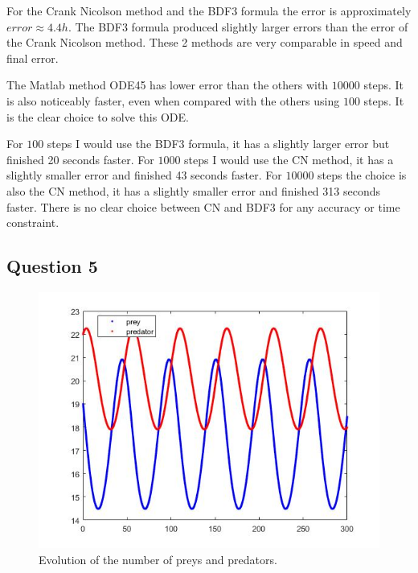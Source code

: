 \documentclass[a4paper, 11pt]{article}
\begin{document}
				For the Crank Nicolson method and the BDF3 formula the error is approximately $error \approx 4.4 h$.
				The BDF3 formula produced slightly larger errors than the error of the Crank Nicolson method.
				These 2 methods are very comparable in speed and final error.
				
				The Matlab method ODE45 has lower error than the others with $ 10000 $ steps.
				It is also noticeably faster, even when compared with the others using $ 100 $ steps.
				It is the clear choice to solve this ODE.
				
				For $100$ steps I would use the BDF3 formula, it has a slightly larger error but finished 20 seconds faster.
				For $1000$ steps I would use the CN method, it has a slightly smaller error and finished 43 seconds faster.
				For $10000$ steps the choice is also the CN method, it has a slightly smaller error and finished 313 seconds faster.
				There is no clear choice between CN and BDF3 for any accuracy or time constraint. 
				
		\subsection*{Question 5}
		
		\begin{figure}[H]
			\centering
			\includegraphics[width=\linewidth]{ex5.jpg}
			\caption{Evolution of the number of preys and predators.}
			\label{fig:ex5}
		\end{figure}

	
	
	
\end{document}
